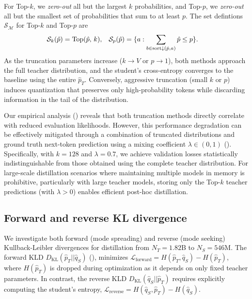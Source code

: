 For Top-$k$,
we \emph{zero-out} all but the largest $k$
probabilities,
and Top-$p$,
we \emph{zero-out} all but the smallest set of
probabilities that sum to at least $p$.
The set defintions $\mathcal{S}_\mathcal{M}$ for Top-$k$ and Top-$p$ are
\begin{align}
    \mathcal{S}_k(\hat p) &= \mathrm{Top}(\hat p,\,k),&
    \mathcal{S}_p(\hat p) &= \{a : \sum\limits_{b \in \mathrm{sort}{\downarrow}(\hat p, a)} \hat p \leq p\}.
    \vspace{-0.1cm}
\end{align}
As the truncation parameters increase ($k \rightarrow V$ or $p \rightarrow 1$), both methods approach the full teacher distribution, and the student's cross-entropy converges to the baseline using the entire $\hat p_T$. 
Conversely, aggressive truncation (small $k$ or $p$) induces quantization that preserves only high-probability tokens while discarding information in the tail of the distribution.

Our empirical analysis () reveals that both truncation methods directly correlate with reduced evaluation likelihoods. However, this performance degradation can be effectively mitigated through a combination of truncated distributions and ground truth next-token prediction using a mixing coefficient $\lambda \in (0,1)$ (). Specifically, with $k=128$ and $\lambda=0.7$, we achieve validation losses statistically indistinguishable from those obtained using the complete teacher distribution. For large-scale distillation scenarios where maintaining multiple models in memory is prohibitive, particularly with large teacher models, storing only the Top-$k$ teacher predictions (with $\lambda > 0$) enables efficient post-hoc distillation.








\FloatBarrier

\subsection{Forward and reverse KL divergence}
\label{ssec:forward-vs-backward}
We investigate both forward (mode spreading) and reverse (mode seeking) Kullback-Leibler divergences for distillation from $N_T=1.82$B to $N_S=546$M. The forward KLD $D_{\text{KL}}(\hat{p}_T || \hat{q}_S)$ (), minimizes $\mathcal{L}_{\text{forward}} = H(\hat{p}_T, \hat{q}_S) - H(\hat{p}_T)$,
where $H(\hat{p}_T)$ is dropped during optimization as it depends on only fixed teacher parameters. In contrast, the reverse KLD $D_{\text{KL}}(\hat{q}_S || \hat{p}_T)$ requires explicitly computing the student's entropy, $\mathcal{L}_{\text{reverse}} = H(\hat{q}_S, \hat{p}_T) - H(\hat{q}_S)$.

